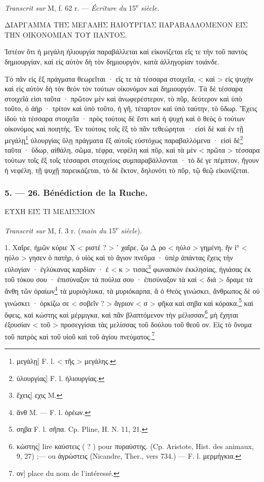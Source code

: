\documentclass[a4paper, 11pt, oneside, polutonikogreek, french]{article}
\begin{document}
\emph{Transcrit sur} M, f. 62 r. --- \emph{Écriture du} 15\textsuperscript{e} \emph{siècle.}

\bigskip

ΔΙΑΡΓΑΜΜΑ ΤΗΣ ΜΕΓΑΛΗΣ ΗΛΙΟΥΡΓΙΑΣ ΠΑΡΑΒΑΛΛΟΜΕΝΟΝ ΕΙΣ ΤΗΝ ΟΙΚΟΝΟΜΙΑΝ ΤΟΥ ΠΑΝΤΟΣ.

Ἰστέον ὅτι ἡ μεγάλη ἡλιουργία παραβάλλεται καὶ εἰκονίζεται εἴς τε τὴν τοῦ παντὸς δημιουργίαν, καὶ εἰς αὐτὸν δὴ τὸν δημιουργὸν, κατὰ ἀλληγορίαν τοιάνδε.

Τὸ πᾶν εἰς ἓξ πράγματα θεωρεῖται · εἴς τε τὰ τέσσαρα στοιχεῖα, < καὶ > εἰς ψυχὴν καὶ εἰς αὐτὸν δὴ τὸν θεὸν τὸν τούτων οἰκονόμον καὶ δημιουργόν. Τὰ δὲ τέσσαρα στοιχεῖά εἰσι ταῦτα · πρῶτον μὲν καὶ ἀνωφερέστερον, τὸ πῦρ, δεύτερον καὶ ὑπὸ τοῦτο, ὁ ἀήρ · τρίτον καὶ ὑπὸ τοῦτο, ἠ γῆ, τέταρτον καὶ ὑπὸ ταύτην, τὸ ὕδωρ. Ἔχεις ἰδοὺ τὰ τέσσαρα στοιχεῖα · πρὸς τούτοις δὲ ἔστι καὶ ἡ ψυχὴ καὶ ὁ θεὸς ὁ τούτων οἰκονόμος καὶ ποιητής. Ἐν τούτοις τοῖς ἓξ τὸ πᾶν τεθεώρηται · εἰσὶ δὲ καὶ ἐν τῇ μεγάλῃ\footnote{μεγάλῃ] F. l. < τῆς > μεγάλης.} ὑλουργίας ὕλῃ πράγματα ἕξ αὐτοῖς εὐστόχως παραβαλλόμενα · εἰσὶ δὲ\footnote{ὑλουργίας] F. l. ἡλιουργίας.} ταῦτα · ὕδωρ, αἰθάλη, σῶμα, τέφρα, νεφέλη καὶ πῦρ, καὶ τὰ μὲν < πρῶτα > τέσσαρα τούτων τοῖς ἕξ τοῖς τέσσαρσι στοιχείοις συμπαραβάλλονται · τὸ δέ γε πέμπτον, ἤγουν ἡ νεφέλη, τῇ ψυχῇ παρεικάζεται, τὸ δὲ ἕκτον, δηλονότι τὸ πῦρ, τῷ θεῷ εἰκονίζεται.

\bigskip
\centerline{\EightStarTaper}
\centerline{\EightStarTaper\EightStarTaper}
\bigskip

\subsubsection{5. --- 26. Bénédiction de la Ruche.}

ΕΥΧΗ ΕΙΣ ΤΙ ΜΕΛΙΣΣΙΟΝ

\emph{Transcrit sur} M, f. 3 r. (\emph{main du} 15\textsuperscript{e} \emph{siècle}).

\bigskip

1. Χαῖρε, ἡμῶν κύριε Χ < ριστέ ? > ʹ χαῖρε, ζω     Δ ρο < ηὐλο > γημένη, ἣν ἰ° < ηὐλο > γησεν ὁ πατὴρ, ὁ υἱὸς καὶ τὸ ἅγιον πνεῦμα · ὑπὲρ ἁπάντας ἔχεις τὴν εὐλογίαν · ἐγλύκανας καρδίαν · ἐ < κ > τισας\footnote{ἔχεις] εχις M.} φωνασκὸν ἐκκλησίας, ἡγιάσας ἐκ τοῦ τόκου σου · ἐπισύναξον τὰ πούλια σου · ἐπισύναξον τὰ      καὶ < διά > δραμε τὰ ἄνθη τῶν ὀραίων\footnote{ἄνθ M. --- F. l. ὀρέων.} τὰ μυριόγλυκα, τὰ μυριόκαρπα, ἃ ὁ Θεὸς γινώσκει, ἄνθρωπος δὲ οὐ γινώσκει · ὀρκίζω σε < σοβεῖν ? > ἄγριον < σ > φῆκα καὶ σηβα καὶ κόρακα,\footnote{σηβα F. l. σῆπα. Cp. Pline, H. N. 11, 21.} καὶ ὄφεις, καὶ κώστης καὶ μέρμιγκα, καὶ πᾶν βλαπτόμενον τὴν μέλισσαν\footnote{κώστης] lire καύστεις ( ? ) pour πυραύστης. (Cp. Aristote, Hist. des animaux, 9, 27) ;--- ou ἀγρώστεις (Nicandre, Ther., vers 734.) --- F. l. μερμήγκια.} μὴ ἔχηται ἐξουσίαν < τοῦ > προσεγγίσαι τὰς μελίσσας τοῦ δούλου τοῦ θεοῦ ον. Εἰς τὸ ὄνομα τοῦ πατρὸς καὶ τοῦ υἱοῦ καὶ τοῦ ἁγίου πνεύματος.\footnote{ον] place du nom de l'intéressé.}
\end{document}
